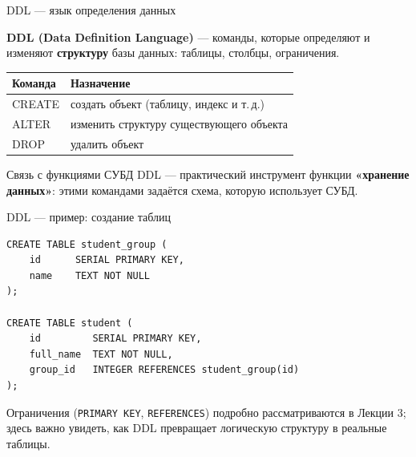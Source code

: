\documentclass[aspectratio=169]{beamer}
\begin{document}
\begin{frame}{DDL — язык определения данных}

\textbf{DDL (Data Definition Language)} — команды, которые
определяют и изменяют \textbf{структуру} базы данных:
таблицы, столбцы, ограничения.

\vspace{0.3cm}

\small
\begin{table}
\centering
\begin{tabular}{>{\ttfamily}p{}|p{}}
\toprule
\textnormal{Команда} & \textnormal{Назначение}\\
\midrule
CREATE & создать объект (таблицу, индекс и т.\,д.)\\
ALTER & изменить структуру существующего объекта\\
DROP & удалить объект\\
\bottomrule
\end{tabular}
\end{table}

\vspace{0.3cm}
\normalsize
\begin{alertblock}{Связь с функциями СУБД}
DDL — практический инструмент функции \textbf{«хранение
данных»}: этими командами задаётся схема, которую
использует СУБД.
\end{alertblock}

\end{frame}


\begin{frame}[fragile]{DDL — пример: создание таблиц}

\small
\begin{verbatim}
CREATE TABLE student_group (
    id      SERIAL PRIMARY KEY,
    name    TEXT NOT NULL
);

CREATE TABLE student (
    id         SERIAL PRIMARY KEY,
    full_name  TEXT NOT NULL,
    group_id   INTEGER REFERENCES student_group(id)
);
\end{verbatim}
\normalsize

\vspace{0.2cm}
\footnotesize
Ограничения (\texttt{PRIMARY KEY}, \texttt{REFERENCES})
подробно рассматриваются в Лекции 3; здесь важно увидеть,
как DDL превращает логическую структуру в реальные таблицы.

\end{frame}
\end{document}
